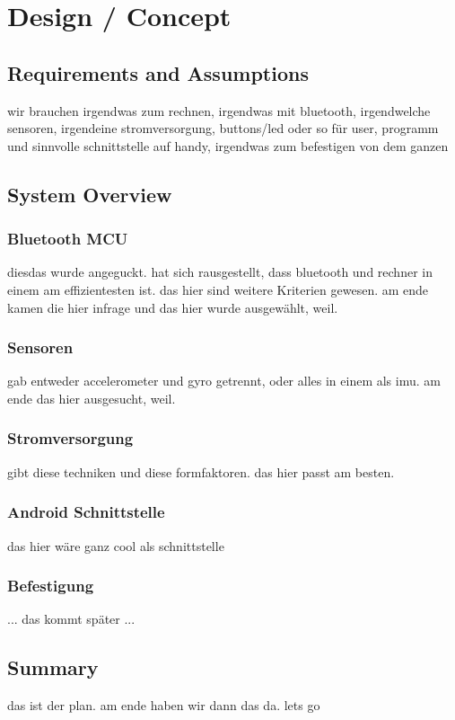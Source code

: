 \chapter{Design / Concept}
\label{ch:design}

\section{Requirements and Assumptions}
wir brauchen irgendwas zum rechnen, irgendwas mit bluetooth, irgendwelche sensoren, irgendeine stromversorgung, buttons/led oder so für user, programm und sinnvolle schnittstelle auf handy, irgendwas zum befestigen von dem ganzen

\section{System Overview}

\subsection{Bluetooth MCU}
diesdas wurde angeguckt. hat sich rausgestellt, dass bluetooth und rechner in einem am effizientesten ist. das hier sind weitere Kriterien gewesen. am ende kamen die hier infrage und das hier wurde ausgewählt, weil.

\subsection{Sensoren}
gab entweder accelerometer und gyro getrennt, oder alles in einem als imu. am ende das hier ausgesucht, weil.

\subsection{Stromversorgung}
gibt diese techniken und diese formfaktoren. das hier passt am besten.

\subsection{Android Schnittstelle}
das hier wäre ganz cool als schnittstelle

\subsection{Befestigung}
... das kommt später ...

\section{Summary}
das ist der plan. am ende haben wir dann das da. lets go
